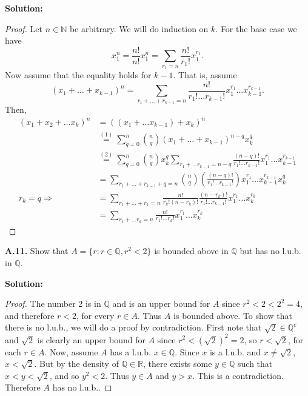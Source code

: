 \documentclass[12pt]{article}
\begin{document}
\begin{itemize}[label={},leftmargin=4mm, itemsep=1em, parsep=1em]
\begin{itemize}[label={},leftmargin=4mm, itemsep=1em, parsep=1em]
    {\bf Solution:}
    \begin{proof}
      Let $n \in \mathbb{N}$ be arbitrary. We will do induction on $k$. For the
      base case we have 
      \[ x_{1}^{n} = \frac{n!}{n!}x_{1}^{n} = \sum_{r_{1} =
      n}\frac{n!}{r_{1}!}x_{1}^{r_{1}}. \]
      Now assume that the equality holds for $k - 1$. That is, assume 
      \begin{equation}
        (x_{1} + \dots + x_{k-1})^{n} = \sum_{r_{1} + \dots + r_{k-1} =
      n}\frac{n!}{r_{1}!\dots r_{k-1}!}x_{1}^{r_{1}}\dots x_{k-1}^{r_{k-1}}.
      \end{equation}
      Then,
      \begin{align*}
        (x_{1} + x_{2} + \dots x_{k})^{n} & = ((x_{1} + \dots x_{k-1}) +
        x_{k})^{n} \\
        & \stackrel{(1)}{=} \sum_{q=0}^{n}\binom{n}{q}(x_{1} + \dots +
        x_{k-1})^{n-q}x_{k}^{q} \\
        & \stackrel{(2)}{=} \sum_{q=0}^{n}\binom{n}{q}x_{k}^{q}\sum_{r_{1}+\dots r_{k-1} =
        n-q}\frac{(n-q)!}{r_{1}!\dots r_{k-1}!}x_{1}^{r_{1}}\dots x_{k-1}^{r_{k-1}}
        \\
        & = \sum_{r_{1} + \dots + r_{k-1} + q = n} \binom{n}{q}\left(
        \frac{(n-q)!}{r_{1}!\dots r_{k-1}!}\right)x_{1}^{r_{1}}\dots
        x_{k-1}^{r_{k-1}}x_{k}^{q} \\
        r_{k} = q \Rightarrow & = \sum_{r_{1} + \dots + r_{k} =
        n}\frac{n!}{r_{k}!(n-r_{k})!}\frac{(n-r_{k})!}{r_{1}!\dots
        r_{k-1}!}x_{1}^{r_{1}} \dots x_{k}^{r_{k}} \\
        & = \sum_{r_{1} + \dots r_{k} = n}\frac{n!}{r_{1}!\dots
        r_{k}!}x_{1}^{r_{1}}\dots x_{k}^{r_{k}}
      \end{align*}
    \end{proof}
  \end{itemize}
\end{itemize}

{\bf A.11.} Show that $A = \{r : r \in \mathbb{Q}, r^{2} < 2\}$ is bounded above
in $\mathbb{Q}$ but has no l.u.b. in $\mathbb{Q}$.

{\bf Solution:}

\begin{proof}
  The number 2 is in $\mathbb{Q}$ and is an upper bound for $A$ since $r^{2} < 2
< 2^{2} = 4$, and therefore $r < 2$, for every $r \in A$. Thus $A$ is
  bounded above. To show that there is no l.u.b., we will do a proof by
  contradiction. First note that $\sqrt{2} \in \mathbb{Q}^{c}$ and $\sqrt{2}$ is
  clearly an upper bound for $A$ since $r^{2} < (\sqrt{2})^{2} = 2$, so $r <
\sqrt{2}$, for each $r \in A$. Now, assume $A$ has a l.u.b. $x \in
  \mathbb{Q}$. Since $x$ is a l.u.b. and $x \neq \sqrt{2}$, $x < \sqrt{2}$. But
  by the density of $\mathbb{Q} \in \mathbb{R}$, there exists some $y \in
  \mathbb{Q}$ such that $x < y < \sqrt{2}$, and so $y^{2} < 2$. Thus $y \in A$
  and $y > x$. This is a contradiction. Therefore $A$ has no l.u.b..
\end{proof}
\end{document}
